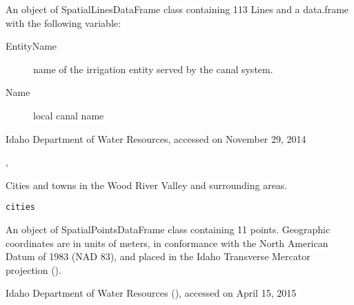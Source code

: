 \documentclass[a4paper]{book}
\begin{document}
%
\begin{Format}
An object of SpatialLinesDataFrame class containing
113 Lines and a data.frame with the following variable:
\begin{description}

\item[EntityName] name of the irrigation entity served by the canal system.
\item[Name] local canal name

\end{description}

\end{Format}
%
\begin{Source}\relax
Idaho Department of Water Resources, accessed on November 29, 2014
\end{Source}
%
\begin{SeeAlso}\relax
{}, 
\end{SeeAlso}
%
\begin{Examples}
\end{Examples}
%
\begin{Description}\relax
Cities and towns in the Wood River Valley and surrounding areas.
\end{Description}
%
\begin{Usage}
\begin{verbatim}
cities
\end{verbatim}
\end{Usage}
%
\begin{Format}
An object of SpatialPointsDataFrame class containing 11 points.
Geographic coordinates are in units of meters, in conformance with the
North American Datum of 1983 (NAD 83), and placed in the
Idaho Transverse Mercator projection ().
\end{Format}
%
\begin{Source}\relax
Idaho Department of Water Resources
(),
accessed on April 15, 2015
\end{Source}
%
\begin{Examples}
\end{Examples}
\end{document}
